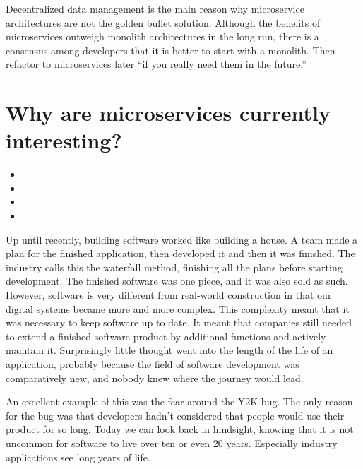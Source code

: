 Decentralized data management is the main reason why microservice architectures are not the golden bullet solution. Although the benefits of microservices outweigh monolith architectures in the long run, there is a consensus among developers that it is better to start with a monolith. Then refactor to microservices later ``if you really need them in the future.'' ~\cite{krivtsov.2019}


\section{Why are microservices currently interesting?}
\label{sec:theory:interesting}

\begin{itemize}
  \item {}
  \item {}
  \item {}
  \item {}
\end{itemize}

Up until recently, building software worked like building a house. A team made a plan for the finished application, then developed it and then it was finished. The industry calls this the waterfall method, finishing all the plans before starting development. The finished software was one piece, and it was also sold as such. However, software is very different from real-world construction in that our digital systems became more and more complex. This complexity meant that it was necessary to keep software up to date. It meant that companies still needed to extend a finished software product by additional functions and actively maintain it. Surprisingly little thought went into the length of the life of an application, probably because the field of software development was comparatively new, and nobody knew where the journey would lead.

An excellent example of this was the fear around the Y2K bug. The only reason for the bug was that developers hadn't considered that people would use their product for so long. Today we can look back in hindsight, knowing that it is not uncommon for software to live over ten or even 20 years. Especially industry applications see long years of life.

